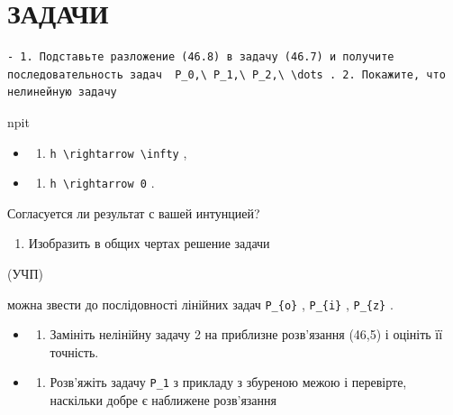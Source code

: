 \documentclass[
  ukrainian,
]{article}
\providecommand{\tightlist}{%
  \setlength{\itemsep}{0pt}\setlength{\parskip}{0pt}}
\begin{document}
\section{ЗАДАЧИ}\label{ux437ux430ux434ux430ux447ux438-6}

\begin{verbatim}
- 1. Подставьте разложение (46.8) в задачу (46.7) и получите последовательность задач  P_0,\ P_1,\ P_2,\ \dots . 2. Покажите, что нелинейную задачу
\end{verbatim}

npit

\begin{itemize}
\tightlist
\item
  \begin{enumerate}
  \def\labelenumi{\alph{enumi})}
  \tightlist
  \item
    \texttt{h\ \textbackslash{}rightarrow\ \textbackslash{}infty} ,
  \end{enumerate}
\item
  \begin{enumerate}
  \def\labelenumi{\arabic{enumi})}
  \setcounter{enumi}{5}
  \tightlist
  \item
    \texttt{h\ \textbackslash{}rightarrow\ 0} .
  \end{enumerate}
\end{itemize}

Согласуется ли результат с вашей интунцией?

\begin{enumerate}
\def\labelenumi{\arabic{enumi}.}
\setcounter{enumi}{3}
\tightlist
\item
  Изобразить в общих чертах решение задачи
\end{enumerate}

(УЧП)

можна звести до послідовності лінійних задач \texttt{P\_\{o\}} ,
\texttt{P\_\{i\}} , \texttt{P\_\{z\}} .

\begin{itemize}
\tightlist
\item
  \begin{enumerate}
  \def\labelenumi{\arabic{enumi}.}
  \setcounter{enumi}{2}
  \tightlist
  \item
    Замініть нелінійну задачу 2 на приблизне розв'язання (46,5) і
    оцініть її точність.
  \end{enumerate}
\item
  \begin{enumerate}
  \def\labelenumi{\arabic{enumi}.}
  \setcounter{enumi}{3}
  \tightlist
  \item
    Розв'яжіть задачу \texttt{P\_1} з прикладу з збуреною межою і
    перевірте, наскільки добре є наближене розв'язання
  \end{enumerate}
\end{itemize}
\end{document}
